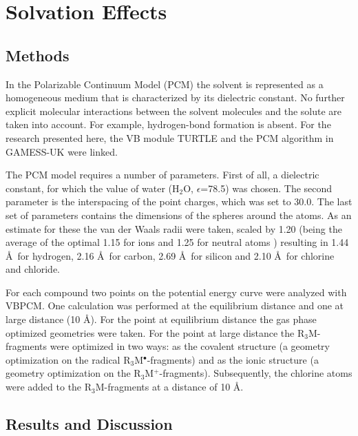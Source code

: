 \section{\label{ch3.sec.solv}Solvation Effects}

\subsection{Methods}

In the Polarizable Continuum Model (PCM) the solvent is represented as a homogeneous medium that is characterized by its dielectric constant. No further explicit molecular interactions between the solvent molecules and the solute are taken into account. For example, hydrogen-bond formation is absent. For the research presented here, the VB module TURTLE and the PCM algorithm in GAMESS-UK were linked.

The PCM model requires a number of parameters. First of all, a dielectric constant, for which the value of water (H$_2$O, $\epsilon$=78.5) was chosen. The second parameter is the interspacing of the point charges, which was set to 30.0\degrees. The last set of parameters contains the dimensions of the spheres around the atoms. As an estimate for these the van der Waals radii \cite{bondi} were taken, scaled by 1.20 (being the average of the optimal 1.15 for ions and 1.25 for neutral atoms \cite{scaling}) resulting in 1.44 \AA\  for hydrogen, 2.16 \AA\  for carbon, 2.69 \AA\ for silicon and 2.10 \AA\ for chlorine and chloride.

For each compound two points on the potential energy curve were analyzed with VBPCM. One calculation was performed at the equilibrium distance and one at large distance (10 \AA). For the point at equilibrium distance the gas phase optimized geometries were taken. For the point at large distance the R$_3$M-fragments were optimized in two ways: as the covalent structure (a geometry optimization on the radical R$_3$M$^\bullet$-fragments) and as the ionic structure (a geometry optimization on the R$_3$M$^{+}$-fragments). Subsequently, the chlorine atoms were added to the R$_3$M-fragments at a distance of 10 \AA. 

\subsection{Results and Discussion}

